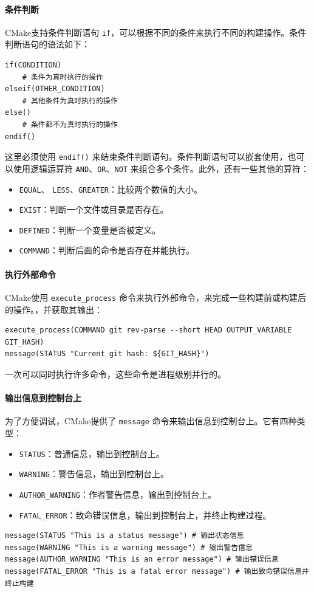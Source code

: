 \paragraph{条件判断} CMake支持条件判断语句 \verb|if|，可以根据不同的条件来执行不同的构建操作。条件判断语句的语法如下：
\begin{verbatim}
if(CONDITION)
    # 条件为真时执行的操作
elseif(OTHER_CONDITION)
    # 其他条件为真时执行的操作
else()
    # 条件都不为真时执行的操作
endif()
\end{verbatim}
这里必须使用 \verb|endif()| 来结束条件判断语句。条件判断语句可以嵌套使用，也可以使用逻辑运算符 \verb|AND|、\verb|OR|、\verb|NOT| 来组合多个条件。此外，还有一些其他的算符：
\begin{itemize}
    \item \verb|EQUAL|、 \verb|LESS|、\verb|GREATER|：比较两个数值的大小。
    \item \verb|EXIST|：判断一个文件或目录是否存在。
    \item \verb|DEFINED|：判断一个变量是否被定义。
    \item \verb|COMMAND|：判断后面的命令是否存在并能执行。
\end{itemize}

\paragraph{执行外部命令} CMake使用 \verb|execute_process| 命令来执行外部命令，来完成一些构建前或构建后的操作。，并获取其输出：
\begin{verbatim}
execute_process(COMMAND git rev-parse --short HEAD OUTPUT_VARIABLE GIT_HASH)
message(STATUS "Current git hash: ${GIT_HASH}")
\end{verbatim}
一次可以同时执行许多命令，这些命令是进程级别并行的。

\paragraph{输出信息到控制台上} 为了方便调试，CMake提供了 \verb|message| 命令来输出信息到控制台上。它有四种类型：
\begin{itemize}
    \item \verb|STATUS|：普通信息，输出到控制台上。
    \item \verb|WARNING|：警告信息，输出到控制台上。
    \item \verb|AUTHOR_WARNING|：作者警告信息，输出到控制台上。
    \item \verb|FATAL_ERROR|：致命错误信息，输出到控制台上，并终止构建过程。
\end{itemize}
\begin{verbatim}
message(STATUS "This is a status message") # 输出状态信息
message(WARNING "This is a warning message") # 输出警告信息
message(AUTHOR_WARNING "This is an error message") # 输出错误信息
message(FATAL_ERROR "This is a fatal error message") # 输出致命错误信息并终止构建
\end{verbatim}

